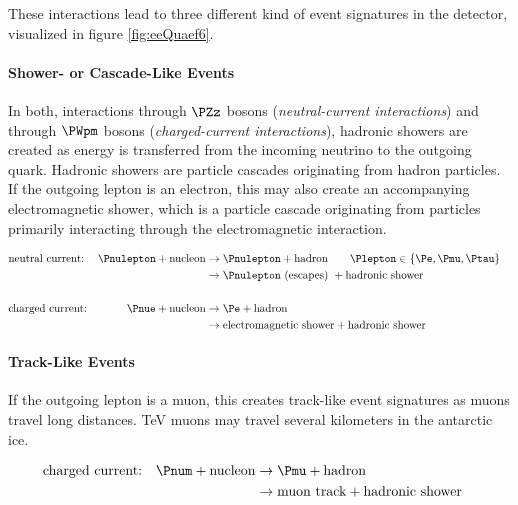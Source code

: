 These interactions lead to three different kind of event signatures in
the \icecube detector, visualized in figure \ref{fig:eeQuaef6}.

\paragraph{Shower- or Cascade-Like Events}

In both, interactions through \(\PZz\) bosons
(\textit{neutral-current interactions}) and through \(\PWpm\) bosons
(\textit{charged-current interactions}), hadronic showers are created as
energy is transferred from the incoming neutrino to the outgoing quark.
Hadronic showers are particle cascades originating from hadron
particles. If the outgoing lepton is an electron, this may also create
an accompanying electromagnetic shower, which is a particle cascade
originating from particles primarily interacting through the
electromagnetic interaction. \cite{energyreco}

\begin{align*}
  & \text{neutral current:} & \Pnulepton + \text{nucleon} & \rightarrow \Pnulepton + \text{hadron} \ \ \ \ \ \ \Plepton \in \{ \Pe, \Pmu, \Ptau \}                             & \\
  &                         &                             & \rightarrow \Pnulepton \text{ (escapes) } + \text{hadronic shower}  & \\ \\
  & \text{charged current:} & \Pnue + \text{nucleon}      & \rightarrow \Pe + \text{hadron}                                     & \\
  &                         &                             & \rightarrow \text{electromagnetic shower} + \text{hadronic shower}  & \\
\end{align*}

\paragraph{Track-Like Events}

If the outgoing lepton is a muon, this creates track-like event
signatures as muons travel long distances. TeV muons may travel several
kilometers in the antarctic ice. \cite{skysearch, mmc}

\begin{align*}
  & \text{charged current:} & \Pnum + \text{nucleon}      & \rightarrow \Pmu + \text{hadron}                                    & \\
  &                         &                             & \rightarrow \text{muon track} + \text{hadronic shower}              & \\
\end{align*}

